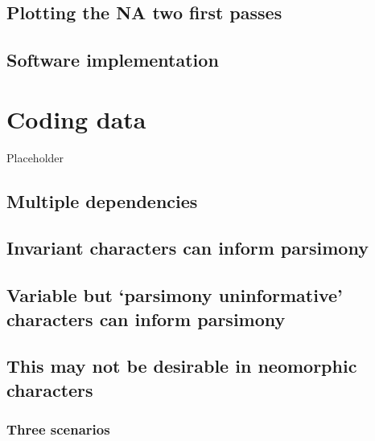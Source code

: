 \documentclass[]{book}
\theoremstyle{definition}
\theoremstyle{definition}
\theoremstyle{definition}
\theoremstyle{remark}
\begin{document}
\hypertarget{plotting-the-na-two-first-passes-4}{%
\section{Plotting the NA two first
passes}\label{plotting-the-na-two-first-passes-4}}

\hypertarget{software}{%
\section{Software implementation}\label{software}}

\hypertarget{coding}{%
\chapter{Coding data}\label{coding}}

Placeholder

\hypertarget{multiple-dependencies}{%
\section{Multiple dependencies}\label{multiple-dependencies}}

\hypertarget{invariant-characters-can-inform-parsimony}{%
\section{Invariant characters can inform
parsimony}\label{invariant-characters-can-inform-parsimony}}

\hypertarget{variable-but-parsimony-uninformative-characters-can-inform-parsimony}{%
\section{Variable but `parsimony uninformative' characters can inform
parsimony}\label{variable-but-parsimony-uninformative-characters-can-inform-parsimony}}

\hypertarget{this-may-not-be-desirable-in-neomorphic-characters}{%
\section{This may not be desirable in neomorphic
characters}\label{this-may-not-be-desirable-in-neomorphic-characters}}

\hypertarget{three-scenarios}{%
\subsection{Three scenarios}\label{three-scenarios}}
\end{document}
